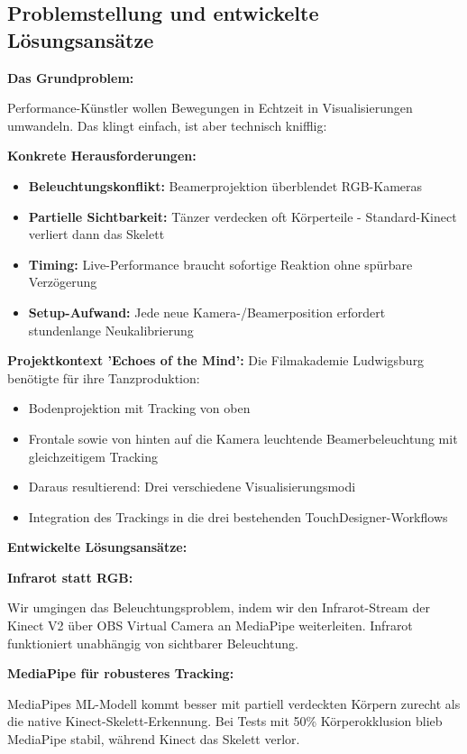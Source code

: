 \subsection{Problemstellung und entwickelte Lösungsansätze}

\textbf{Das Grundproblem:}

\raggedright Performance-Künstler wollen Bewegungen in Echtzeit in Visualisierungen umwandeln. Das klingt einfach, ist aber technisch knifflig: 

\textbf{Konkrete Herausforderungen:}
\begin{itemize}
    \item \textbf{Beleuchtungskonflikt:} Beamerprojektion überblendet RGB-Kameras
    \item \textbf{Partielle Sichtbarkeit:} Tänzer verdecken oft Körperteile - Standard-Kinect verliert dann das Skelett
    \item \textbf{Timing:} Live-Performance braucht sofortige Reaktion ohne spürbare Verzögerung
    \item \textbf{Setup-Aufwand:} Jede neue Kamera-/Beamerposition erfordert stundenlange Neukalibrierung
\end{itemize}



\textbf{Projektkontext 'Echoes of the Mind':}
Die Filmakademie Ludwigsburg benötigte für ihre Tanzproduktion:
\begin{itemize}
    \item Bodenprojektion mit Tracking von oben
    \item Frontale sowie von hinten auf die Kamera leuchtende Beamerbeleuchtung mit gleichzeitigem Tracking
    \item Daraus resultierend: Drei verschiedene Visualisierungsmodi
    \item Integration des Trackings in die drei bestehenden TouchDesigner-Workflows
\end{itemize}

\textbf{Entwickelte Lösungsansätze:}

\textbf{Infrarot statt RGB:}
\raggedright Wir umgingen das Beleuchtungsproblem, indem wir den Infrarot-Stream der Kinect V2 über OBS Virtual Camera an MediaPipe weiterleiten. Infrarot funktioniert unabhängig von sichtbarer Beleuchtung.

\textbf{MediaPipe für robusteres Tracking:}
\raggedright MediaPipes ML-Modell kommt besser mit partiell verdeckten Körpern zurecht als die native Kinect-Skelett-Erkennung. Bei Tests mit 50\% Körperokklusion blieb MediaPipe stabil, während Kinect das Skelett verlor.

